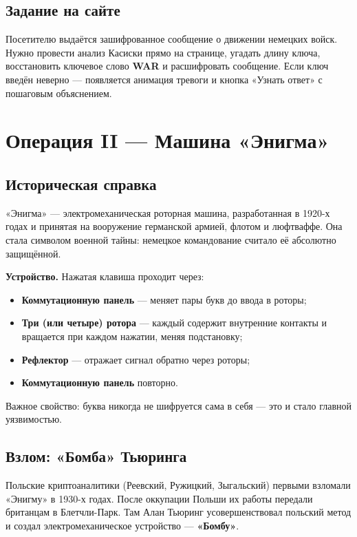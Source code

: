 \documentclass[12pt, a4paper]{article}
\makeatletter
\newenvironment{factbox}{%
  \vspace{4pt}\begin{lrbox}{\@tempboxa}\begin{minipage}{0.93\textwidth}%
  \setlength{\parskip}{5pt}\small
}{%
  \end{minipage}\end{lrbox}%
  \fcolorbox{amber}{blockbg}{\usebox{\@tempboxa}}\vspace{4pt}
}
\makeatother
\begin{document}
\subsection{Задание на сайте}

Посетителю выдаётся зашифрованное сообщение о движении немецких войск.
Нужно провести анализ Касиски прямо на странице, угадать длину ключа,
восстановить ключевое слово \textbf{WAR} и расшифровать сообщение.
Если ключ введён неверно --- появляется анимация тревоги и кнопка
«Узнать ответ» с пошаговым объяснением.

\section{Операция II — Машина «Энигма»}

\subsection{Историческая справка}

«Энигма» --- электромеханическая роторная машина, разработанная в 1920-х годах
и принятая на вооружение германской армией, флотом и люфтваффе. Она стала
символом военной тайны: немецкое командование считало её абсолютно
защищённой.

\begin{factbox}
\textbf{Устройство.} Нажатая клавиша проходит через:
\begin{itemize}[leftmargin=1cm, topsep=2pt, itemsep=1pt]
  \item \textbf{Коммутационную панель} --- меняет пары букв до ввода в роторы;
  \item \textbf{Три (или четыре) ротора} --- каждый содержит внутренние
        контакты и вращается при каждом нажатии, меняя подстановку;
  \item \textbf{Рефлектор} --- отражает сигнал обратно через роторы;
  \item \textbf{Коммутационную панель} повторно.
\end{itemize}
Важное свойство: буква никогда не шифруется сама в себя --- это и стало
главной уязвимостью.
\end{factbox}

\subsection{Взлом: «Бомба» Тьюринга}

Польские криптоаналитики (Реевский, Ружицкий, Зыгальский) первыми взломали
«Энигму» в 1930-х годах. После оккупации Польши их работы передали британцам в
Блетчли-Парк. Там Алан Тьюринг усовершенствовал польский метод и создал
электромеханическое устройство --- \textbf{«Бомбу»}.
\end{document}

